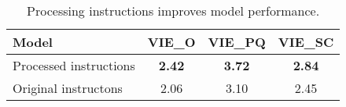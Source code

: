 \begin{table}[!h]
    \centering
    \caption{Processing instructions improves model performance.}
    \label{tab:process_insructions}
    \begin{tabular}{lccc}
    \toprule
    \textbf{Model} & \textbf{VIE\_O} & \textbf{VIE\_PQ} & \textbf{VIE\_SC} \\
    \midrule
    Processed instructions & \textbf{2.42} & \textbf{3.72} & \textbf{2.84} \\
    Original instructons & 2.06 & 3.10 & 2.45 \\
    \bottomrule
    \end{tabular}
\end{table}
